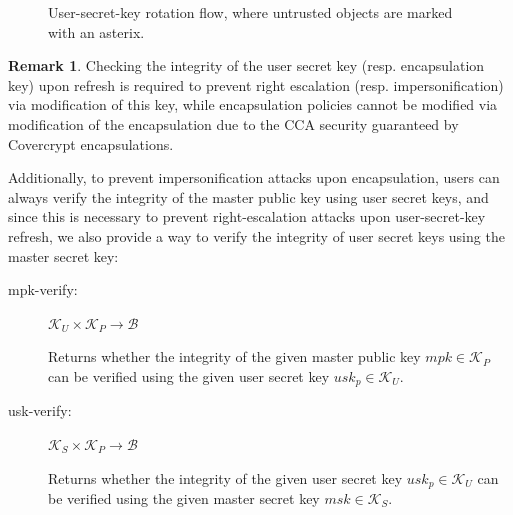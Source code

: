 \documentclass[a4paper]{article}
\theoremstyle{definition}
\newtheorem*{remark}{Remark}
\newcommand{\cB}{\mathcal{B}}
\newcommand{\cK}{\mathcal{K}}
\begin{document}
\begin{figure}
  \center
  \caption{\label{rotation-flow}User-secret-key rotation flow, where untrusted objects are marked with an asterix.}
\end{figure}

\begin{remark}
Checking the  integrity of the user  secret key (resp.  encapsulation  key) upon
refresh is required  to prevent right escalation  (resp.  impersonification) via
modification of  this key, while  encapsulation policies cannot be  modified via
modification  of  the  encapsulation  due  to the  CCA  security  guaranteed  by
Covercrypt encapsulations.
\end{remark}

Additionally, to prevent impersonification attacks upon encapsulation, users can
always verify the integrity of the master public key using user secret keys, and
since this is necessary to prevent right-escalation attacks upon user-secret-key
refresh, we also provide a way to verify the integrity of user secret keys using
the master secret key:
\begin{description}
\item[{mpk-verify:}] \(\cK_U \times \cK_P \rightarrow \cB\)

Returns whether the  integrity of the given master public  key \(mpk \in \cK_P\)
can be verified using the given user secret key \(usk_p \in \cK_U\).

\item[{usk-verify:}] \(\cK_S \times \cK_P \rightarrow \cB\)

Returns whether the  integrity of the given user secret  key \(usk_p \in \cK_U\)
can be verified using the given master secret key \(msk \in \cK_S\).
\end{description}
\end{document}
